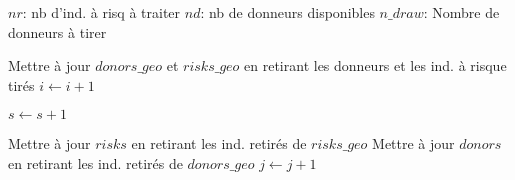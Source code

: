 \documentclass[10pt]{article}
\begin{document}
\begin{algorithm}
{{{$nr$: nb d'ind. à risq à traiter\;
$nd$: nb de donneurs disponibles\;
$n\_draw$: Nombre de donneurs à tirer\;


Mettre à jour $donors\_geo$ et $risks\_geo$ en retirant les donneurs et les ind. à risque tirés\;
$i \gets i + 1$\;

}

$s \gets s + 1$\;   

}

Mettre à jour $risks$ en retirant les ind. retirés de $risks\_geo$\;
Mettre à jour $donors$ en retirant les ind. retirés de $donors\_geo$\;
$j \gets j + 1$\;


}



\end{algorithm}




\end{document}

